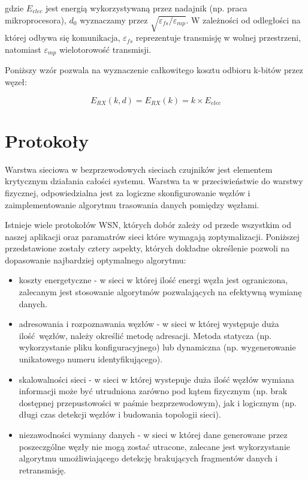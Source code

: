 \documentclass[a4paper,12pt,twoside,openany]{report}
\begin{document}
gdzie $E_{elec}$ jest energią wykorzystywaną przez nadajnik (np. praca mikroprocesora), $d_{0}$ wyznaczamy przez $\sqrt{\varepsilon_{fs} / \varepsilon_{mp}}$.
W zależności od odległości na której odbywa się komunikacja, $\varepsilon_{fs}$ reprezentuje transmisję w wolnej przestrzeni, natomiast $\varepsilon_{mp}$
wielotorowość transmisji.

Poniższy wzór pozwala na wyznaczenie całkowitego kosztu odbioru k-bitów przez węzeł:

\[E_{RX}(k,d) = E_{RX}(k) = k \times E_{elec}\]

\section{Protokoły}

Warstwa sieciowa w bezprzewodowych sieciach czujników jest elementem krytycznym działania całości systemu.
Warstwa ta w przeciwieństwie do warstwy fizycznej, odpowiedzialna jest za logiczne skonfigurowanie węzłów i
zaimplementowanie algorytmu trasowania danych pomiędzy węzłami.

Istnieje wiele protokołów WSN, których dobór zależy od przede wszystkim od naszej aplikacji oraz
paramatrów sieci które wymagają zoptymalizacji. Poniższej przedstawione zostały cztery aspekty, których dokładne określenie pozwoli
na dopasowanie najbardziej optymalnego algorytmu:

\begin{itemize}
 \item koszty energetyczne - w sieci w której ilość energi węzła jest ograniczona, zalecanym jest stosowanie algorytmów pozwalających
       na efektywną wymianę danych.
 \item adresowania i rozpoznawania węzłów - w sieci w której występuje duża ilość węzłów, należy określić metodę adresacji.
       Metoda statycza (np. wykorzystanie pliku konfiguracyjnego) lub dynamiczna (np. wygenerowanie unikatowego numeru identyfikującego).
 \item skalowalności sieci - w sieci w której wystepuje duża ilość węzłów wymiana informacji może być utrudniona zarówno pod kątem fizycznym
       (np. brak dostępnej przepustowości w paśmie bezprzewodowym), jak i logicznym (np. długi czas detekcji węzłów i budowania topologii sieci).
 \item niezawodności wymiany danych - w sieci w której dane generowane przez poszeczgólne węzły nie mogą zostać utracone, zalecane jest wykorzystanie
       algorytmu umożliwiającego detekcję brakujących fragmentów danych i retransmisję.
\end{itemize}
\end{document}
